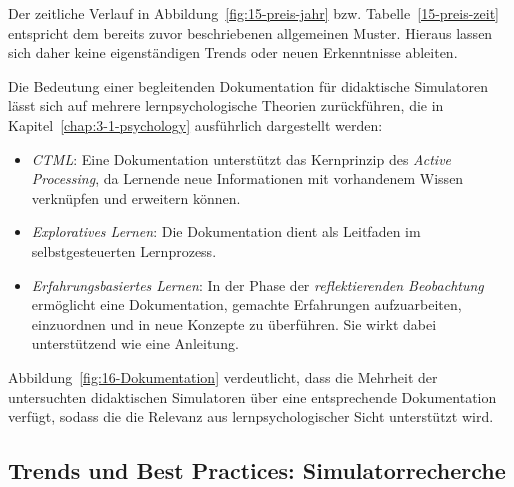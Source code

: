 Der zeitliche Verlauf in Abbildung~\ref{fig:15-preis-jahr} bzw. Tabelle~\ref{15-preis-zeit} entspricht dem bereits zuvor beschriebenen allgemeinen Muster. Hieraus lassen sich daher keine eigenständigen Trends oder neuen Erkenntnisse ableiten.

Die Bedeutung einer begleitenden Dokumentation für didaktische Simulatoren lässt sich auf mehrere lernpsychologische Theorien zurückführen, die in Kapitel~\ref{chap:3-1-psychology} ausführlich dargestellt werden:

\begin{itemize}
    \item \textit{\ac{CTML}}: Eine Dokumentation unterstützt das Kernprinzip des \textit{Active Processing}, da Lernende neue Informationen mit vorhandenem Wissen verknüpfen und erweitern können.
    \item \textit{Exploratives Lernen}: Die Dokumentation dient als Leitfaden im selbstgesteuerten Lernprozess.
    \item \textit{Erfahrungsbasiertes Lernen}: In der Phase der \textit{reflektierenden Beobachtung} ermöglicht eine Dokumentation, gemachte Erfahrungen aufzuarbeiten, einzuordnen und in neue Konzepte zu überführen. Sie wirkt dabei unterstützend wie eine Anleitung.
\end{itemize}

Abbildung~\ref{fig:16-Dokumentation} verdeutlicht, dass die Mehrheit der untersuchten didaktischen Simulatoren über eine entsprechende Dokumentation verfügt, sodass die die Relevanz aus lernpsychologischer Sicht unterstützt wird.

\subsection{Trends und Best Practices: Simulatorrecherche}
			
